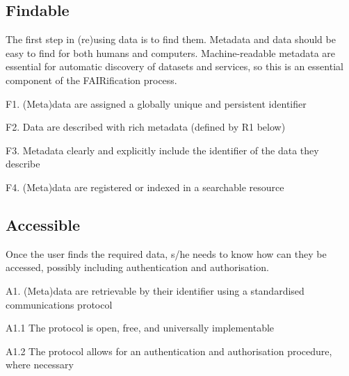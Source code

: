\documentclass[
  english,
  paper=a4,
  oneside,captions=tableheading
]{scrbook}
\renewenvironment{quote}{\begin{customblockquote}\list{}{\rightmargin=0em\leftmargin=0em}%
\item\relax\color{blockquote-text}\ignorespaces}{\unskip\unskip\endlist\end{customblockquote}}
\begin{document}
\hypertarget{findable}{%
\subsection{Findable}\label{findable}}

\begin{quote}
The first step in (re)using data is to find them. Metadata and data
should be easy to find for both humans and computers. Machine-readable
metadata are essential for automatic discovery of datasets and services,
so this is an essential component of the FAIRification process.
\end{quote}

\begin{quote}
F1. (Meta)data are assigned a globally unique and persistent identifier
\end{quote}

\begin{quote}
F2. Data are described with rich metadata (defined by R1 below)
\end{quote}

\begin{quote}
F3. Metadata clearly and explicitly include the identifier of the data
they describe
\end{quote}

\begin{quote}
F4. (Meta)data are registered or indexed in a searchable resource
\end{quote}

\hypertarget{accessible}{%
\subsection{Accessible}\label{accessible}}

\begin{quote}
Once the user finds the required data, s/he needs to know how can they
be accessed, possibly including authentication and authorisation.
\end{quote}

\begin{quote}
A1. (Meta)data are retrievable by their identifier using a standardised
communications protocol
\end{quote}

\begin{quote}
A1.1 The protocol is open, free, and universally implementable
\end{quote}

\begin{quote}
A1.2 The protocol allows for an authentication and authorisation
procedure, where necessary
\end{quote}
\end{document}
